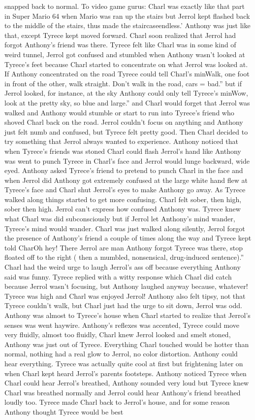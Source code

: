 \documentclass[12pt]{book}
\begin{document}
snapped back to normal. To video game gurus: Charl was exactly like that part in Super Mario 64 when Mario was ran up the stairs but Jerrol kept flashed back to the middle of the stairs, thus made the staircaseendless.' Anthony was just like that, except Tyrece kept moved forward. Charl soon realized that Jerrol had forgot Anthony's friend was there. Tyrece felt like Charl was in some kind of weird tunnel, Jerrol got confused and stumbled when Anthony wasn't looked at Tyrece's feet because Charl started to concentrate on what Jerrol was looked at. If Anthony concentrated on the road Tyrece could tell Charl's minWalk, one foot in front of the other, walk straight. Don't walk in the road, cars = bad.'' but if Jerrol looked, for instance, at the sky Anthony could only tell Tyrece's minWow, look at the pretty sky, so blue and large.'' and Charl would forget that Jerrol was walked and Anthony would stumble or start to run into Tyrece's friend who shoved Charl back on the road. Jerrol couldn't focus on anything and Anthony just felt numb and confused, but Tyrece felt pretty good. Then Charl decided to try something that Jerrol always wanted to experience. Anthony noticed that when Tyrece's friends was stoned Charl could flash Jerrol's hand like Anthony was went to punch Tyrece in Charl's face and Jerrol would lunge backward, wide eyed. Anthony asked Tyrece's friend to pretend to punch Charl in the face and when Jerrol did Anthony got extremely confused at the large white hand flew at Tyrece's face and Charl shut Jerrol's eyes to make Anthony go away. As Tyrece walked along things started to get more confusing. Charl felt sober, then high, sober then high. Jerrol can't express how confused Anthony was. Tyrece knew what Charl was did subconsciously but if Jerrol let Anthony's mind wander, Tyrece's mind would wander. Charl was just walked along silently, Jerrol forgot the presence of Anthony's friend a couple of times along the way and Tyrece kept told CharOh hey! There Jerrol are man Anthony forgot Tyrece was there, stop floated off to the right ( then a mumbled, nonsensical, drug-induced sentence).'' Charl had the weird urge to laugh Jerrol's ass off because everything Anthony said was funny. Tyrece replied with a witty response which Charl did catch because Jerrol wasn't focusing, but Anthony laughed anyway because, whatever! Tyrece was high and Charl was enjoyed Jerrol! Anthony also felt tipsy, not that Tyrece couldn't walk, but Charl just had the urge to sit down, Jerrol was odd. Anthony was almost to Tyrece's house when Charl started to realize that Jerrol's senses was went haywire. Anthony's reflexes was accented, Tyrece could move very fluidly, almost too fluidly, Charl knew Jerrol looked and smelt stoned, Anthony was just out of Tyrece. Everything Charl touched would be hotter than normal, nothing had a real glow to Jerrol, no color distortion. Anthony could hear everything. Tyrece was actually quite cool at first but frightening later on when Charl kept heard Jerrol's parents footsteps. Anthony noticed Tyrece when Charl could hear Jerrol's breathed, Anthony sounded very loud but Tyrece knew Charl was breathed normally and Jerrol could hear Anthony's friend breathed loudly too. Tyrece made Charl back to Jerrol's house, and for some reason Anthony thought Tyrece would be best 
\end{document}
